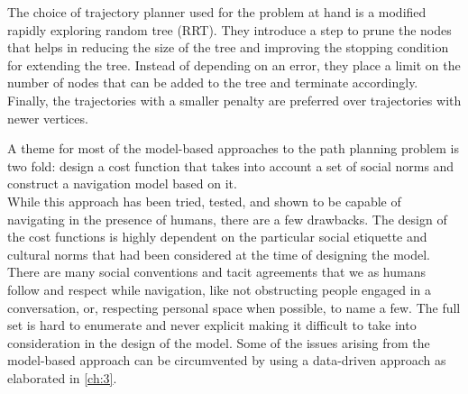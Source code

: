 The choice of trajectory planner used for the problem at hand is a modified rapidly exploring random tree (RRT). They introduce a step to prune the nodes that helps in reducing the size of the tree and improving the stopping condition for extending the tree. Instead of depending on an error, they place a limit on the number of nodes that can be added to the tree and terminate accordingly. %
 Finally, the trajectories with a smaller penalty are preferred over trajectories with newer vertices.

\par
A theme for most of the model-based approaches to the path planning problem is two fold: design a cost function that takes into account a set of social norms and construct a navigation model based on it.\\
While this approach has been tried, tested, and shown to be capable of navigating in the presence of humans, there are a few drawbacks. The design of the cost functions is highly dependent on the particular social etiquette and cultural norms that had been considered at the time of designing the model. There are many social conventions and tacit agreements that we as humans follow and respect while navigation, like not obstructing people engaged in a conversation, or, respecting personal space when possible, to name a few. The full set is hard to enumerate and never explicit making it difficult to take into consideration in the design of the model. Some of the issues arising from the model-based approach can be circumvented by using a data-driven approach as elaborated in \autoref{ch:3}.












